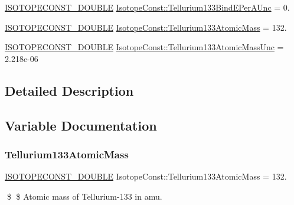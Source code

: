 \begin{DoxyCompactItemize}
\mbox{\hyperlink{group___isotope_const-_macros_ga8f45a7272ce02c0b4c65c44636ed719a}{I\+S\+O\+T\+O\+P\+E\+C\+O\+N\+S\+T\+\_\+\+D\+O\+U\+B\+LE}} \mbox{\hyperlink{group___isotope_const-_tellurium-_te133_gad67306b24e370d2774eec1cd8fb1f1e2}{Isotope\+Const\+::\+Tellurium133\+Bind\+E\+Per\+A\+Unc}} = 0.
\item 
\mbox{\hyperlink{group___isotope_const-_macros_ga8f45a7272ce02c0b4c65c44636ed719a}{I\+S\+O\+T\+O\+P\+E\+C\+O\+N\+S\+T\+\_\+\+D\+O\+U\+B\+LE}} \mbox{\hyperlink{group___isotope_const-_tellurium-_te133_ga81dcc1bf00c2b6a9e202b4e7767fad78}{Isotope\+Const\+::\+Tellurium133\+Atomic\+Mass}} = 132.
\item 
\mbox{\hyperlink{group___isotope_const-_macros_ga8f45a7272ce02c0b4c65c44636ed719a}{I\+S\+O\+T\+O\+P\+E\+C\+O\+N\+S\+T\+\_\+\+D\+O\+U\+B\+LE}} \mbox{\hyperlink{group___isotope_const-_tellurium-_te133_gad22bf4ddf074c54623800df64dcc9d57}{Isotope\+Const\+::\+Tellurium133\+Atomic\+Mass\+Unc}} = 2.\+218e-\/06
\end{DoxyCompactItemize}


\subsection{Detailed Description}


\subsection{Variable Documentation}
\mbox{\label{group___isotope_const-_tellurium-_te133_ga81dcc1bf00c2b6a9e202b4e7767fad78}} 
\subsubsection{\texorpdfstring{Tellurium133\+Atomic\+Mass}{Tellurium133AtomicMass}}
{\footnotesize\ttfamily \mbox{\hyperlink{group___isotope_const-_macros_ga8f45a7272ce02c0b4c65c44636ed719a}{I\+S\+O\+T\+O\+P\+E\+C\+O\+N\+S\+T\+\_\+\+D\+O\+U\+B\+LE}} Isotope\+Const\+::\+Tellurium133\+Atomic\+Mass = 132.}

\$ \$ Atomic mass of Tellurium-\/133 in amu. \mbox{\label{group___isotope_const-_tellurium-_te133_gad22bf4ddf074c54623800df64dcc9d57}} 
